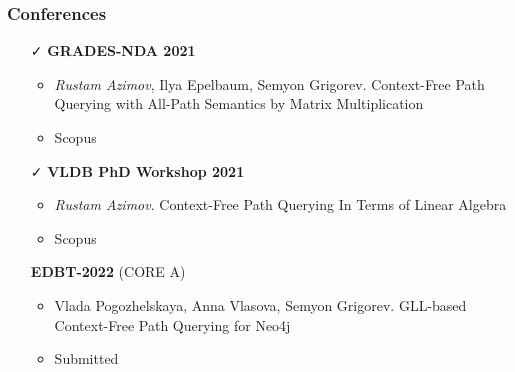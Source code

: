 \documentclass[xcolor=table, aspectratio=169]{beamer}
\begin{document}
\begin{frame}[fragile]

  \frametitle{Conferences}
      \begin{itemize}

      \item[\faCheck] \textbf{GRADES-NDA 2021}
      \begin{itemize}
        \item \emph{Rustam Azimov}, Ilya Epelbaum, Semyon Grigorev. Context-Free Path Querying with All-Path Semantics by Matrix Multiplication
        \item Scopus
      \end{itemize}

      \item[\faCheck] \textbf{VLDB PhD Workshop 2021}
      \begin{itemize}
         \item \emph{Rustam Azimov}. Context-Free Path Querying In Terms of Linear Algebra
         \item Scopus
      \end{itemize}

      \item[\faHourglassHalf] \textbf{EDBT-2022} (CORE A) 
      \begin{itemize}
        \item Vlada Pogozhelskaya, Anna Vlasova, Semyon Grigorev. GLL-based Context-Free Path Querying for Neo4j
        \item Submitted
      \end{itemize}

\end{itemize}
\end{frame}
\end{document}
